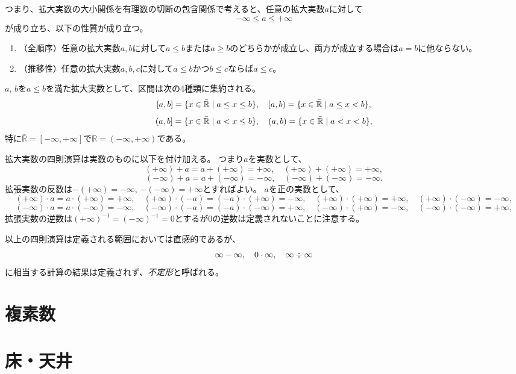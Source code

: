 つまり、拡大実数の大小関係を有理数の切断の包含関係で考えると、任意の拡大実数$a$に対して
$$
-\infty \le a \le +\infty
$$
が成り立ち、以下の性質が成り立つ。
\begin{enumerate}
\item
（全順序）任意の拡大実数$a, b$に対して$a \le b$または$a \ge b$のどちらかが成立し、両方が成立する場合は$a = b$に他ならない。
\item
（推移性）任意の拡大実数$a, b, c$に対して$a \le b$かつ$b \le c$ならば$a \le c$。
\end{enumerate}

$a$, $b$を$a \le b$を満た拡大実数として、区間は次の4種類に集約される。
$$
[a, b] = \{ x \in \bar{\mathbb{R}} \mid a \le x \le b \},
\quad [a, b) = \{ x \in \bar{\mathbb{R}} \mid a \le x < b \},
$$
$$
(a, b] = \{ x \in \bar{\mathbb{R}} \mid a < x \le b \},
\quad (a, b) = \{ x \in \bar{\mathbb{R}} \mid a < x < b \},
$$
特に$\bar{\mathbb{R}} = [-\infty, +\infty]$で$\mathbb{R} = (-\infty, +\infty)$である。

拡大実数の四則演算は実数のものに以下を付け加える。
つまり$a$を実数として、
$$
(+\infty)+a = a+(+\infty) = +\infty,
\quad (+\infty)+(+\infty) = +\infty,
$$
$$
(-\infty)+a = a+(-\infty) = -\infty,
\quad (-\infty)+(-\infty) = -\infty.
$$
拡張実数の反数は$-(+\infty) = -\infty$, $-(-\infty) = +\infty$とすればよい。
$a$を正の実数として、
$$
(+\infty)\cdot a = a\cdot (+\infty) = +\infty,
\quad (+\infty)\cdot (-a) = (-a)\cdot (+\infty) = -\infty,
\quad (+\infty)\cdot (+\infty) = +\infty,
\quad (+\infty)\cdot (-\infty) = -\infty,
$$
$$
(-\infty)\cdot a = a\cdot (-\infty) = -\infty,
\quad (-\infty)\cdot (-a) = (-a)\cdot (-\infty) = +\infty,
\quad (-\infty)\cdot (+\infty) = -\infty,
\quad (-\infty)\cdot (-\infty) = +\infty,
$$
拡張実数の逆数は$(+\infty)^{-1} = (-\infty)^{-1} = 0$とするが$0$の逆数は定義されないことに注意する。

以上の四則演算は定義される範囲においては直感的であるが、
$$
\infty-\infty,
\quad 0\cdot \infty,
\quad \infty\divs \infty
$$
に相当する計算の結果は定義されず、\emph{不定形}と呼ばれる。

\section{複素数}

\section{床・天井}

